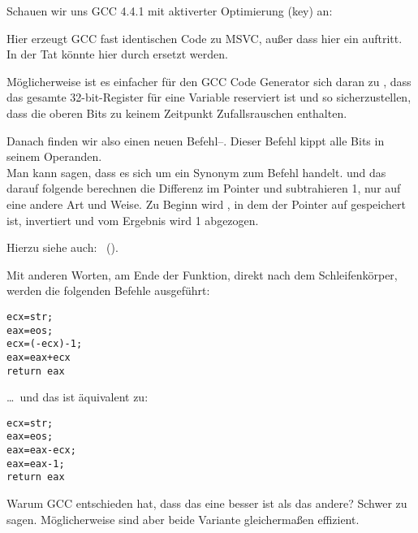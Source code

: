 


Schauen wir uns GCC 4.4.1 mit aktiverter Optimierung (\Othree key) an:


 
Hier erzeugt GCC fast identischen Code zu MSVC, außer dass hier ein \MOVZX
auftritt. 
In der Tat könnte \MOVZX hier durch  ersetzt werden.
 
Möglicherweise ist es einfacher für den GCC Code Generator sich daran zu
, dass das gesamte 32-bit-\EDX Register für eine \Tchar Variable
reserviert ist und so sicherzustellen, dass die oberen Bits zu keinem Zeitpunkt
Zufallsrauschen enthalten.

\label{strlen_NOT_ADD}

Danach finden wir also einen neuen Befehl--\NOT. Dieser Befehl kippt alle Bits
in seinem Operanden.\\
Man kann sagen, dass es sich um ein Synonym zum Befehl 
handelt. 
\NOT und das darauf folgende \ADD berechnen die Differenz im Pointer und
subtrahieren 1, nur auf eine andere Art und Weise. 
Zu Beginn wird \ECX, in dem der Pointer auf  gespeichert ist, invertiert
und vom Ergebnis wird 1 abgezogen.

Hierzu siehe auch: \q{\SignedNumbersSectionName}~().
 
Mit anderen Worten, am Ende der Funktion, direkt nach dem Schleifenkörper,
werden die folgenden Befehle ausgeführt:

\begin{lstlisting}[style=customc]
ecx=str;
eax=eos;
ecx=(-ecx)-1; 
eax=eax+ecx
return eax
\end{lstlisting}

\dots~und das ist äquivalent zu:

\begin{lstlisting}[style=customc]
ecx=str;
eax=eos;
eax=eax-ecx;
eax=eax-1;
return eax
\end{lstlisting}

Warum GCC entschieden hat, dass das eine besser ist als das andere? Schwer zu
sagen.
Möglicherweise sind aber beide Variante gleichermaßen effizient.
